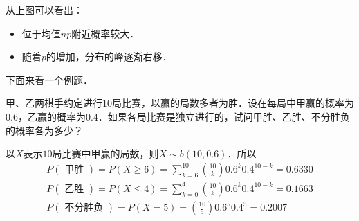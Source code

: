 从上图可以看出：
\begin{itemize}
\item 位于均值$np$附近概率较大．
\item 随着$p $的增加，分布的峰逐渐右移．
\end{itemize}

下面来看一个例题．
\begin{example}{}
甲、乙两棋手约定进行$10 $局比赛，以赢的局数多者为胜．设在每局中甲赢的概率为$0.6$，乙赢的概率为$0. 4$．如果各局比赛是独立进行的，试问甲胜、乙胜、不分胜负的概率各为多少？

以$X $表示$10 $局比赛中甲赢的局数，则$X\sim b(10,0. 6)$．所以
\begin{equation}
\begin{array}{l}P(\text { 甲胜 })=P(X \geqslant 6)=\sum_{k=6}^{10}\binom{10}{k} 0.6^{k} 0.4^{10-k}=0.6330 \\ P(\text { 乙胜 })=P(X \leqslant 4)=\sum_{k=0}^{4}\binom{10}{k} 0.6^{k} 0.4^{10-k}=0.1663 \\ P(\text { 不分胜负 })=P(X=5)=\binom{10}{5} 0.6^{5} 0.4^{5}=0.2007\end{array}
\end{equation}
\end{example}
